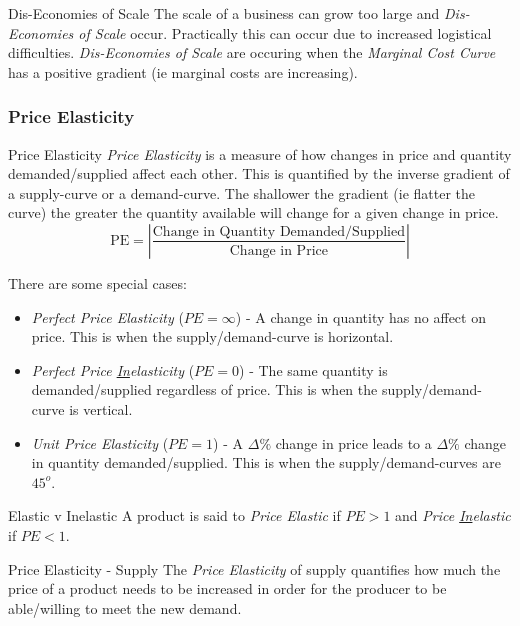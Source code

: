 \documentclass[11pt,a4paper]{article}
\begin{document}
  \begin{remark}{Dis-Economies of Scale}
    The scale of a business can grow too large and \textit{Dis-Economies of Scale} occur. Practically this can occur due to increased logistical difficulties. \textit{Dis-Economies of Scale} are occuring when the \textit{Marginal Cost Curve} has a positive gradient (ie marginal costs are increasing).
  \end{remark}

\subsubsection{Price Elasticity} \label{sec_PriceElasticity}

  \begin{definition}{Price Elasticity}
    \textit{Price Elasticity} is a measure of how changes in price and quantity demanded/supplied affect each other. This is quantified by the inverse gradient of a supply-curve or a demand-curve. The shallower the gradient (ie flatter the curve) the greater the quantity available will change for a given change in price.
    \[ \text{PE}=\left|\frac{\text{Change in Quantity Demanded/Supplied}}{\text{Change in Price}}\right| \]
    \par There are some special cases:
    \begin{itemize}
      \item \textit{Perfect Price Elasticity} ($PE=\infty$) - A change in quantity has no affect on price. This is when the supply/demand-curve is horizontal.
      \item \textit{Perfect Price \underline{In}elasticity} ($PE=0$) - The same quantity is demanded/supplied regardless of price. This is when the supply/demand-curve is vertical.
      \item \textit{Unit Price Elasticity} ($PE=1$) - A $\Delta\%$ change in price leads to a $\Delta\%$ change in quantity demanded/supplied. This is when the supply/demand-curves are $45^o$.
    \end{itemize}
  \end{definition}

  \begin{remark}{Elastic v Inelastic}
    A product is said to \textit{Price Elastic} if $PE>1$ and \textit{Price \underline{In}elastic} if $PE<1$.
  \end{remark}

  \begin{remark}{Price Elasticity - Supply}
    The \textit{Price Elasticity} of supply quantifies how much the price of a product needs to be increased in order for the producer to be able/willing to meet the new demand.
  \end{remark}
\end{document}

